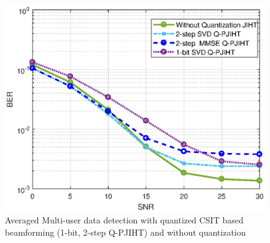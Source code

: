 \begin{figure}[h!]
    \centering
    \includegraphics[scale=0.8]{figures/fig_ch_rec/detection_iht.eps}
\caption{Averaged Multi-user data detection with quantized CSIT based beamforming (1-bit, 2-step Q-PJIHT) and without quantization}
\label{Fdetection-JIHT}
\end{figure}

